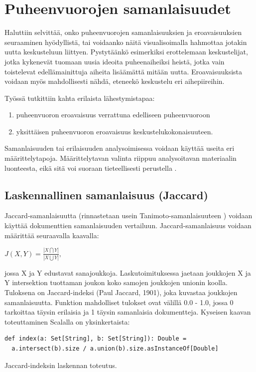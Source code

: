 \documentclass[11pt,a4paper,oneside]{memoir}
\begin{document}
\section{Puheenvuorojen samanlaisuudet}
Haluttiin selvittää, onko puheenvuorojen samanlaisuuksien ja eroavaisuuksien seuraaminen hyödyllistä, tai voidaanko näitä visualisoimalla hahmottaa jotakin uutta keskusteluun liittyen. Pystytäänkö esimerkiksi erottelemaan keskustelijat, jotka kykenevät tuomaan uusia ideoita puheenaiheiksi heistä, jotka vain toistelevat edellämainittuja aiheita lisäämättä mitään uutta. Eroavaisuuksista voidaan myös mahdollisesti nähdä, eteneekö keskustelu eri aihepiireihin.

Työssä tutkittiin kahta erilaista lähestymistapaa:
\begin{enumerate}
\item puheenvuoron eroavaisuus verrattuna edelliseen puheenvuoroon
\item yksittäisen puheenvuoron eroavaisuus keskustelukokonaisuuteen.
\end{enumerate}

Samanlaisuuden tai erilaisuuden analysoimisessa voidaan käyttää useita eri  määrittelytapoja. Määrittelytavan valinta riippuu analysoitavan materiaalin luonteesta, eikä sitä voi suoraan tieteellisesti perustella \cite[s. 298]{encyclopedia-of-distances}.

\subsection{Laskennallinen samanlaisuus (Jaccard)}
Jaccard-samanlaisuutta (rinnastetaan usein Tanimoto-samanlaisuuteen \cite[s. 299]{encyclopedia-of-distances}) voidaan käyttää dokumenttien samanlaisuuden vertailuun. Jaccard-samanlaisuus voidaan määrittää seuraavalla kaavalla:

\begin{math}
J(X, Y) = \frac{| X \bigcap Y |}{| X \bigcup Y |},
\end{math}

jossa X ja Y edustavat sanajoukkoja. Laskutoimituksessa jaetaan joukkojen X ja Y intersektion tuottaman joukon koko samojen joukkojen unionin koolla. Tuloksena on Jaccard-indeksi (Paul Jaccard, 1901), joka kuvastaa joukkojen samanlaisuutta. Funktion mahdolliset tulokset ovat välillä 0.0 - 1.0, jossa 0 tarkoittaa täysin erilaisia ja 1 täysin samanlaisia dokumentteja. Kyseisen kaavan toteuttaminen Scalalla on yksinkertaista:

\begin{program}
  \begin{verbatim}
def index(a: Set[String], b: Set[String]): Double =
  a.intersect(b).size / a.union(b).size.asInstanceOf[Double]
  \end{verbatim}
  \caption{Jaccard-indeksin laskennan toteutus.}
\end{program}
\end{document}
